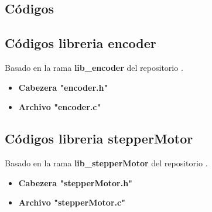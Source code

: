 %
%

\begin{apendicesenv}
\partapendices

\chapter{Códigos}
\label{chap:codigos}

\section{Códigos libreria encoder} \label{cod:lib_encoder}

    Basado en la rama \textbf{lib\_encoder} del repositorio \cite{Santana2025GitHub}.

    \begin{itemize}

        \item \textbf{Cabezera "encoder.h"} 
        

        \item \textbf{Archivo "encoder.c"}
        

    \end{itemize}

\section{Códigos libreria stepperMotor} \label{cod:lib_stepperMotor}

    Basado en la rama \textbf{lib\_stepperMotor} del repositorio \cite{Santana2025GitHub}.

    \begin{itemize}

        \item \textbf{Cabezera "stepperMotor.h"} 
        

        \item \textbf{Archivo "stepperMotor.c"}
        

    \end{itemize}

\end{apendicesenv}